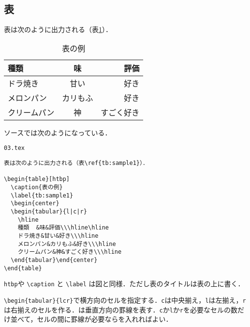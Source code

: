 \subsection{表}

表は次のように出力される（表\ref{tb:sample1}）．

\begin{table}[htbp]
  \caption{表の例}
  \label{tb:sample1}
  \begin{center}
  \begin{tabular}{l|c|r}
    \hline
    種類	&味&評価\\\hline\hline
    ドラ焼き&甘い&好き\\\hline
    メロンパン&カリもふ&好き\\\hline
    クリームパン&神&すごく好き\\\hline
  \end{tabular}\end{center}
\end{table}

ソースでは次のようになっている．

\begin{itembox}[l]{\texttt{03.tex}}
\begin{verbatim}
表は次のように出力される（表\ref{tb:sample1}）．

\begin{table}[htbp]
  \caption{表の例}
  \label{tb:sample1}
  \begin{center}
  \begin{tabular}{l|c|r}
    \hline
    種類	&味&評価\\\hline\hline
    ドラ焼き&甘い&好き\\\hline
    メロンパン&カリもふ&好き\\\hline
    クリームパン&神&すごく好き\\\hline
  \end{tabular}\end{center}
\end{table}
\end{verbatim}
\end{itembox}

\texttt{htbp}や \verb|\caption| と \verb|\label| は図と同様．ただし表のタイトルは表の上に書く．

\verb|\begin{tabular}{l|\texttt{\textbar}\texttt{c}\texttt{\textbar}\verb|r}|で横方向のセルを指定する．\texttt{c}は中央揃え，\texttt{l}は左揃え，\texttt{r}は右揃えのセルを作る．\texttt{\textbar}は垂直方向の罫線を表す．\texttt{c}か\texttt{l}か\texttt{r}を必要なセルの数だけ並べて，セルの間に罫線が必要なら\texttt{\textbar}を入れればよい．

